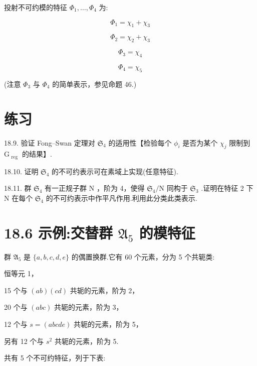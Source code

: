 \documentclass[10pt]{article}
\begin{document}
投射不可约模的特征 \({\Phi }_{1},\ldots ,{\Phi }_{4}\) 为:

\[
{\Phi }_{1} = {\chi }_{1} + {\chi }_{3}
\]

\[
{\Phi }_{2} = {\chi }_{2} + {\chi }_{3}
\]

\[
{\Phi }_{3} = {\chi }_{4}
\]

\[
{\Phi }_{4} = {\chi }_{5}
\]

(注意 \({\Phi }_{3}\) 与 \({\Phi }_{4}\) 的简单表示，参见命题 46.)

\section*{练习}

18.9. 验证 Fong–Swan 定理对 \({\mathfrak{S}}_{4}\) 的适用性【检验每个 \({\phi }_{i}\) 是否为某个 \({\chi }_{j}\) 限制到 \({\mathrm{G}}_{\text{ reg }}\) 的结果】.

18.10. 证明 \({\mathfrak{S}}_{4}\) 的不可约表示可在素域上实现(任意特征).

18.11. 群 \({\mathfrak{S}}_{4}\) 有一正规子群 \(\mathrm{N}\) ，阶为 4，使得 \({\mathfrak{S}}_{4}/\mathrm{N}\) 同构于 \({\mathfrak{S}}_{3}\) .证明在特征 2 下 \(\mathrm{N}\) 在每个 \({\mathfrak{S}}_{4}\) 的不可约表示中作平凡作用.利用此分类此类表示.

\section*{18.6 示例:交替群 \({\mathfrak{A}}_{5}\) 的模特征}

群 \({\mathfrak{A}}_{5}\) 是 \(\{ a,b,c,d,e\}\) 的偶置换群.它有 60 个元素，分为 5 个共轭类:

恒等元 1，

15 个与 \(\left( {ab}\right) \left( {cd}\right)\) 共轭的元素，阶为 2，

20 个与 \(\left( {abc}\right)\) 共轭的元素，阶为 3，

12 个与 \(s = \left( {abcde}\right)\) 共轭的元素，阶为 5，

另有 12 个与 \({s}^{2}\) 共轭的元素，阶为 5.

共有 5 个不可约特征，列于下表:

\begin{center}
\end{center}
\end{document}

